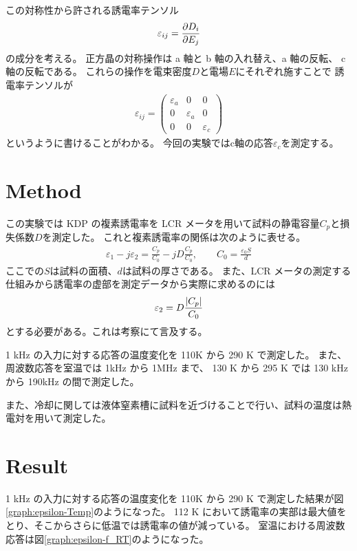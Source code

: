\documentclass[9pt,dvipdfmx,a4paper]{jsarticle}
\begin{document}
この対称性から許される誘電率テンソル
\begin{align}
    \varepsilon_{ij}=\pdv{D_i}{E_j}
\end{align}
の成分を考える。
正方晶の対称操作は a 軸と b 軸の入れ替え、a 軸の反転、 c 軸の反転である。
これらの操作を電束密度\(D\)と電場\(E\)にそれぞれ施すことで
誘電率テンソルが
\begin{align}
    \varepsilon_{ij}=
    \begin{pmatrix}
        \varepsilon_a & 0 & 0\\
        0 & \varepsilon_a & 0\\
        0 & 0 & \varepsilon_c
    \end{pmatrix}
\end{align}
というように書けることがわかる。
今回の実験ではc軸の応答\(\varepsilon_c\)を測定する。


\section{Method}
この実験では KDP の複素誘電率を LCR メータを用いて試料の静電容量\(C_p\)と損失係数\(D\)を測定した。
これと複素誘電率の関係は次のように表せる。
\begin{align}
    \varepsilon_1 - j\varepsilon_2 = \frac{C_p}{C_0}-jD\frac{C_p}{C_0}, \qquad
    C_0 = \frac{\varepsilon_0 S}{d}
\end{align}
ここでの\(S\)は試料の面積、\(d\)は試料の厚さである。
また、LCR メータの測定する仕組みから誘電率の虚部を測定データから実際に求めるのには
\begin{align}
    \varepsilon_2 = D \frac{\abs{C_p}}{C_0}
\end{align}
とする必要がある。これは考察にて言及する。

1 kHz の入力に対する応答の温度変化を 110K から 290 K で測定した。
また、周波数応答を室温では 1kHz から 1MHz まで、
130 K から 295 K では 130 kHz から 190kHz の間で測定した。

また、冷却に関しては液体窒素槽に試料を近づけることで行い、試料の温度は熱電対を用いて測定した。

\clearpage
\section{Result}
1 kHz の入力に対する応答の温度変化を 110K から 290 K で測定した結果が図\ref{graph:epsilon-Temp}のようになった。
112 K において誘電率の実部は最大値をとり、そこからさらに低温では誘電率の値が減っている。
室温における周波数応答は図\ref{graph:epsilon-f_RT}のようになった。
\end{document}
